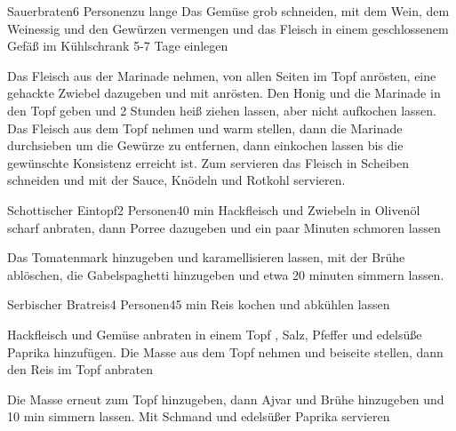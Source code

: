 \begin{recipe}{Sauerbraten}{6 Personen}{zu lange}
Das Gemüse grob schneiden, mit dem Wein, dem Weinessig und den Gewürzen vermengen und das Fleisch in einem geschlossenem Gefäß im Kühlschrank 5-7 Tage einlegen

Das Fleisch aus der Marinade nehmen, von allen Seiten im Topf anrösten, eine gehackte Zwiebel dazugeben und mit anrösten. Den Honig und die Marinade in den Topf geben und 2 Stunden heiß ziehen lassen, aber nicht aufkochen lassen. Das Fleisch aus dem Topf nehmen und warm stellen, dann die Marinade durchsieben um die Gewürze zu entfernen, dann einkochen lassen bis die gewünschte Konsistenz erreicht ist.
Zum servieren das Fleisch in Scheiben schneiden und mit der Sauce, Knödeln und Rotkohl servieren.
\end{recipe}


\begin{recipe}{Schottischer Eintopf}{2 Personen}{40 min}
Hackfleisch und Zwiebeln in Olivenöl scharf anbraten, dann Porree dazugeben und ein paar Minuten schmoren lassen

Das Tomatenmark hinzugeben und karamellisieren lassen, mit der Brühe ablöschen, die Gabelspaghetti hinzugeben und etwa 20 minuten simmern lassen.
\end{recipe}


\begin{recipe}{Serbischer Bratreis}{4 Personen}{45 min}
Reis kochen und abkühlen lassen

Hackfleisch und Gemüse anbraten in einem Topf , Salz, Pfeffer und edelsüße Paprika hinzufügen.
Die Masse aus dem Topf nehmen und beiseite stellen, dann den Reis im Topf anbraten

Die Masse erneut zum Topf hinzugeben, dann Ajvar und Brühe hinzugeben und 10 min simmern lassen. Mit Schmand und edelsüßer Paprika servieren
\end{recipe}


